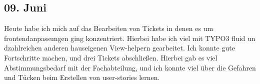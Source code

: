 \subsection{09. Juni}
Heute habe ich mich auf das Bearbeiten von Tickets in denen es um frontendanpassungen ging konzentriert. Hierbei habe ich viel mit TYPO3 fluid un dzahlreichen anderen hauseigenen View-helpern gearbeitet. Ich konnte gute Fortschritte machen, und drei Tickets abschließen. Hierbei gab es viel Abstimmungsbedarf mit der Fachabteilung, und ich konnte viel über die Gefahren und Tücken beim Erstellen von user-stories lernen. 